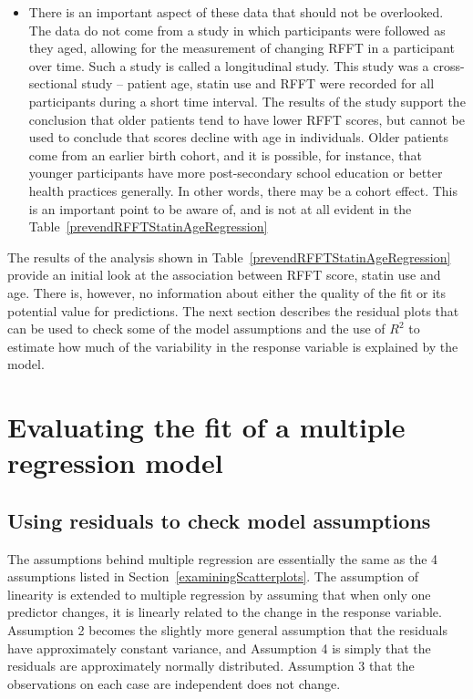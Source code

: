 \begin{itemize}
  \item There is an important aspect of these data that should not be overlooked.  The data do not come from a study in which participants were followed as they aged, allowing for the measurement of changing RFFT in a participant over time. Such a study is called a longitudinal study.  This study was a cross-sectional study -- patient age, statin use and RFFT were recorded for all participants during a short time interval.  The results of the study support the conclusion that older patients tend to have lower RFFT scores, but cannot be used to conclude that scores decline with age in individuals.  Older patients come from an earlier birth cohort, and it is possible, for instance, that younger participants have more post-secondary school education or better health practices generally.  In other words, there may be a cohort effect.  This is an important point to be aware of, and is not at all evident in the Table~\ref{prevendRFFTStatinAgeRegression}
  
 \end{itemize}
 
 
The results of the analysis shown in Table~\ref{prevendRFFTStatinAgeRegression} provide an initial look at the association between RFFT score, statin use and age. There is, however, no information about either the quality of the fit or its potential value for predictions. The next section describes the residual plots that can be used to check some of the model assumptions and the use of $R^2$ to estimate how much of the variability in the response variable is explained by the model.

\section{Evaluating the fit of a multiple regression model}

\subsection{Using residuals to check model assumptions}

The assumptions behind multiple regression are essentially the same as the 4 assumptions listed in Section~\ref{examiningScatterplots}.  The assumption of linearity is extended to multiple regression by assuming that when only one predictor changes, it is linearly related to the change in the response variable.  Assumption 2 becomes the slightly more general assumption that the residuals have approximately constant variance, and Assumption 4 is simply that the residuals are approximately normally distributed. Assumption 3 that the observations on each case are independent does not change. 

